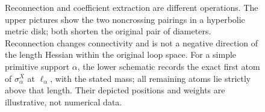 \begin{figure}[htbp]
\caption{Reconnection and coefficient extraction are different operations.
The upper pictures show the two noncrossing pairings in a hyperbolic
metric disk; both shorten the original pair of diameters. Reconnection
changes connectivity and is not a negative direction of the length
Hessian within the original loop space. For a simple primitive support
$\alpha$, the lower schematic records the exact first atom of
$\sigma_\alpha^X$ at $\ell_\alpha$, with the stated mass; all remaining
atoms lie strictly above that length. Their depicted positions and
weights are illustrative, not numerical data.}
\label{fig:mono-reconnection-atoms}
\end{figure}
